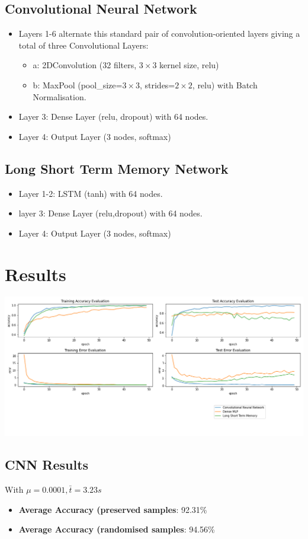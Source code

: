 \documentclass[12pt]{article}
\begin{document}
\subsection{Convolutional Neural Network}
\begin{itemize}
\item Layers 1-6 alternate this standard pair of convolution-oriented layers giving a total of three Convolutional Layers:
\begin{itemize}
\item a: 2DConvolution (32 filters, $3\times 3$ kernel size, relu)
\item b: MaxPool (pool\_size=$3\times 3$, strides=$2\times 2$, relu)  with Batch Normalisation.
\end{itemize}
\item Layer 3: Dense Layer (relu, dropout) with 64 nodes.
\item Layer 4: Output Layer (3 nodes, softmax)
\end{itemize}
\subsection{Long Short Term Memory Network}
\begin{itemize}
\item Layer 1-2: LSTM (tanh) with 64 nodes.
\item layer 3: Dense Layer (relu,dropout) with 64 nodes.
\item Layer 4: Output Layer (3 nodes, softmax)
\end{itemize}
\section{Results}
\includegraphics[width= 1.00 \textwidth]{accuracyMeasures.png}
\subsection{CNN Results}
With $\mu=0.0001, \bar{t}=3.23s$
\begin{itemize}
\item \textbf{Average Accuracy (preserved samples}: 92.31\%
\item \textbf{Average Accuracy (randomised samples}: 94.56\%
\end{itemize}
\end{document}
